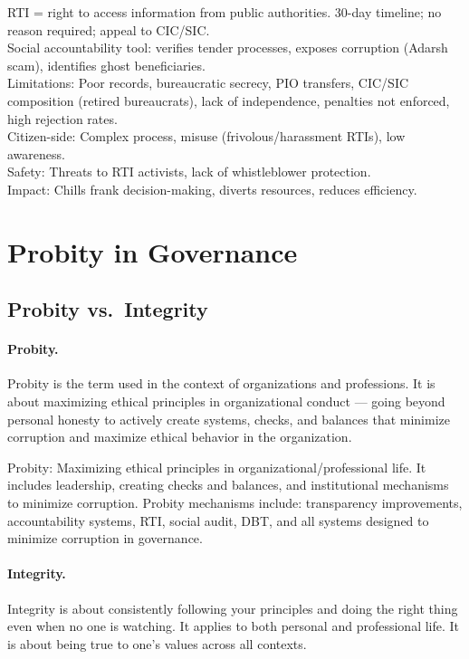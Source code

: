 \begin{QuickRevision}
RTI = right to access information from public authorities. 30-day timeline; no reason required; appeal to CIC/SIC.\\
Social accountability tool: verifies tender processes, exposes corruption (Adarsh scam), identifies ghost beneficiaries.\\
Limitations: Poor records, bureaucratic secrecy, PIO transfers, CIC/SIC composition (retired bureaucrats), lack of independence, penalties not enforced, high rejection rates.\\
Citizen-side: Complex process, misuse (frivolous/harassment RTIs), low awareness.\\
Safety: Threats to RTI activists, lack of whistleblower protection.\\
Impact: Chills frank decision-making, diverts resources, reduces efficiency.
\end{QuickRevision}

\section{Probity in Governance}

\subsection{Probity vs.\ Integrity}

\paragraph{Probity.} Probity is the term used in the context of organizations and professions. It is about maximizing ethical principles in organizational conduct --- going beyond personal honesty to actively create systems, checks, and balances that minimize corruption and maximize ethical behavior in the organization.

\begin{KeyConcept}
Probity: Maximizing ethical principles in organizational/professional life. It includes leadership, creating checks and balances, and institutional mechanisms to minimize corruption. Probity mechanisms include: transparency improvements, accountability systems, RTI, social audit, DBT, and all systems designed to minimize corruption in governance.
\end{KeyConcept}

\paragraph{Integrity.} Integrity is about consistently following your principles and doing the right thing even when no one is watching. It applies to both personal and professional life. It is about being true to one's values across all contexts.

